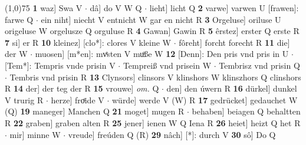 \documentclass[8pt,a4paper,notitlepage]{article}
\begin{document}
\begin{table}[ht]
\begin{minipage}[t]{0.5\linewidth}
\line(1,0){75} \newline
\textbf{1} waz] Swa V  $\cdot$ dâ] do V W Q  $\cdot$ lieht] licht Q \textbf{2} varwe] varwen U [frawen]: farwe Q  $\cdot$ ein niht] niecht V entnicht W gar en nicht R \textbf{3} Orgeluse] oriluse U origeluse W orgelusze Q orguluse R \textbf{4} Gawan] Gawin R \textbf{5} êrstez] erster Q erste R \textbf{7} si] er R \textbf{10} kleinez] [clo*]: clores V kleine W  $\cdot$ fôreht] forcht forecht R \textbf{11} die] der W  $\cdot$ muosen] [m*en]: mvͤsten V muͦße W \textbf{12} [Denn]: Den pris vnd pris in U  $\cdot$ [Tem*]: Tempris vnde prisin V  $\cdot$ Tempreiß vnd prisein W  $\cdot$ Tembrisz vnd prisin Q  $\cdot$ Tembris vnd prisin R \textbf{13} Clynsors] clinsors V klinshors W klinszhors Q clinshors R \textbf{14} der] der teg der R \textbf{15} vrouwe] \textit{om.} Q  $\cdot$ den] den úwern R \textbf{16} dürkel] dunkel V trurig R  $\cdot$ herze] froͤide V  $\cdot$ würde] werde V (W) R \textbf{17} gedrücket] gedauchet W (Q) \textbf{19} maneger] Manchen Q \textbf{21} moget] mugen R  $\cdot$ behaben] beiagen Q behaltten R \textbf{22} graben] graben alten R \textbf{25} jener] ienen W Q Iena R \textbf{26} heiet] heizt Q het R  $\cdot$ mir] minne W  $\cdot$ vreude] freúden Q (R) \textbf{29} nâch] [*]: durch V \textbf{30} sô] Do Q \newline
\end{minipage}
\end{table}
\end{document}
